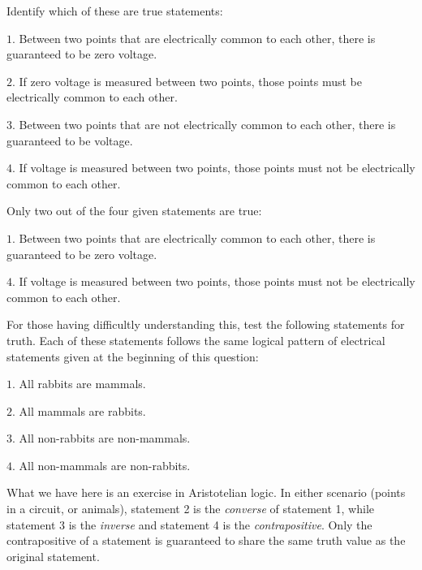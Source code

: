 

Identify which of these are true statements:

\medskip
\item{$1.$} Between two points that are electrically common to each other, there is guaranteed to be zero voltage.
\item{$2.$} If zero voltage is measured between two points, those points must be electrically common to each other.
\item{$3.$} Between two points that are not electrically common to each other, there is guaranteed to be voltage.
\item{$4.$} If voltage is measured between two points, those points must not be electrically common to each other.
\medskip







Only two out of the four given statements are true:

\medskip
\item{$1.$} Between two points that are electrically common to each other, there is guaranteed to be zero voltage.
\item{$4.$} If voltage is measured between two points, those points must not be electrically common to each other.
\medskip

For those having difficultly understanding this, test the following statements for truth.  Each of these statements follows the same logical pattern of electrical statements given at the beginning of this question:

\medskip
\item{$1.$} All rabbits are mammals.
\item{$2.$} All mammals are rabbits.
\item{$3.$} All non-rabbits are non-mammals.
\item{$4.$} All non-mammals are non-rabbits.
\medskip







What we have here is an exercise in Aristotelian logic.  In either scenario (points in a circuit, or animals), statement 2 is the {\it converse} of statement 1, while statement 3 is the {\it inverse} and statement 4 is the {\it contrapositive}.  Only the contrapositive of a statement is guaranteed to share the same truth value as the original statement.

